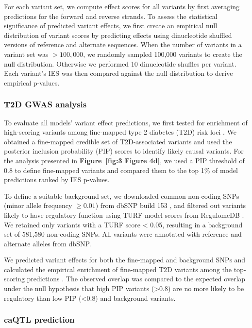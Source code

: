 For each variant set, we compute effect scores for all variants by first averaging predictions for the forward and reverse strands. To assess the statistical significance of predicted variant effects, we first create an empirical null distribution of variant scores by predicting effects using dinucleotide shuffled versions of reference and alternate sequences. When the number of variants in a variant set was \(> 100{,}000\), we randomly sampled 100{,}000 variants to create the null distribution. Otherwise we performed 10 dinucleotide shuffles per variant. Each variant’s IES was then compared against the null distribution to derive empirical p-values.

\subsubsection{T2D GWAS analysis}

To evaluate all models’ variant effect predictions, we first tested for enrichment of high-scoring variants among fine-mapped type 2 diabetes (T2D) risk loci \cite{Mahajan2022-hu}. We obtained a fine-mapped credible set of T2D-associated variants and used the posterior inclusion probability (PIP) scores to identify likely causal variants. For the analysis presented in \textbf{Figure~\ref{fig:3 Figure 4d}}, we used a PIP threshold of 0.8 to define fine-mapped variants and compared them to the top 1\% of model predictions ranked by IES p-values.

To define a suitable background set, we downloaded common non-coding SNPs (minor allele frequency \(\geq 0.01\)) from dbSNP build 153 \cite{Sherry2001-pk}, and filtered out variants likely to have regulatory function using TURF model scores from RegulomeDB \cite{Dong2023-fh}. We retained only variants with a TURF score < 0.05, resulting in a background set of 581,580 non-coding SNPs. All variants were annotated with reference and alternate alleles from dbSNP.

We predicted variant effects for both the fine-mapped and background SNPs and calculated the empirical enrichment of fine-mapped T2D variants among the top-scoring predictions \cite{Pampari2025-lm}. The observed overlap was compared to the expected overlap under the null hypothesis that high PIP variants (>0.8) are no more likely to be regulatory than low PIP (<0.8) and background variants.

\subsubsection{caQTL prediction}

